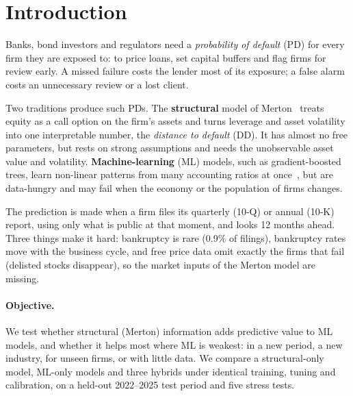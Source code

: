 
\section{Introduction}
\label{sec:introduction}

Banks, bond investors and regulators need a \emph{probability of default} (PD) for every firm they are
exposed to: to price loans, set capital buffers and flag firms for review early. A missed failure costs
the lender most of its exposure; a false alarm costs an unnecessary review or a lost client.

Two traditions produce such PDs. The \textbf{structural} model of Merton~\cite{merton1974} treats equity
as a call option on the firm's assets and turns leverage and asset volatility into one interpretable number,
the \emph{distance to default} (DD). It has almost no free parameters, but rests on strong assumptions and
needs the unobservable asset value and volatility. \textbf{Machine-learning} (ML) models, such as gradient-boosted
trees, learn non-linear patterns from many accounting ratios at once~\cite{moscatelli2020}, but are data-hungry
and may fail when the economy or the population of firms changes.

The prediction is made when a firm files its quarterly (10-Q) or annual (10-K) report, using only what is
public at that moment, and looks 12 months ahead. Three things make it hard: bankruptcy is rare (0.9\% of
filings), bankruptcy rates move with the business cycle, and free price data omit exactly the firms that
fail (delisted stocks disappear), so the market inputs of the Merton model are missing.

\paragraph{Objective.} We test whether structural (Merton) information adds predictive value to ML models,
and whether it helps most where ML is weakest: in a new period, a new industry, for unseen firms, or with
little data. We compare a structural-only model, ML-only models and three hybrids under identical training,
tuning and calibration, on a held-out 2022--2025 test period and five stress tests.

